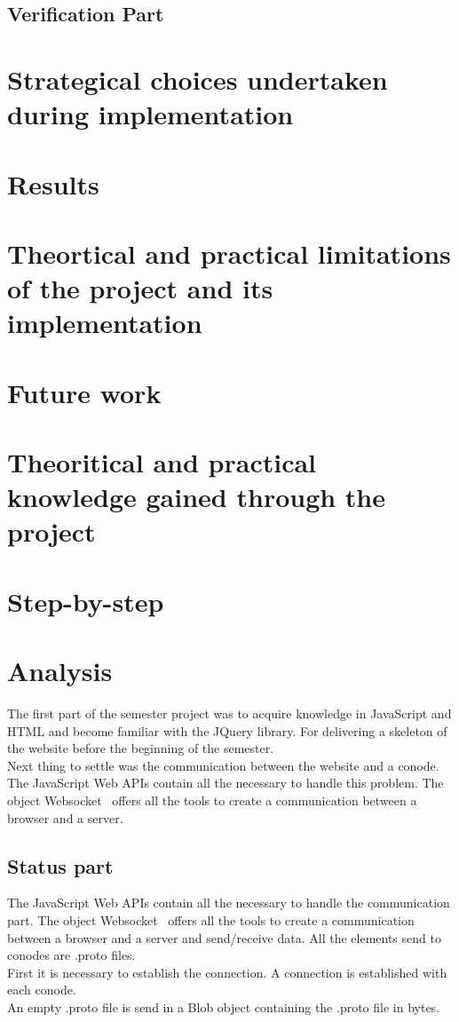 \documentclass[11pt, a4paper, twoside, openright, openany]{book} %
\begin{document}

\section{Verification Part}


\chapter{Strategical choices undertaken during implementation}
\chapter{Results}
\chapter{Theortical and practical limitations of the project and its implementation}
\chapter{Future work}
\chapter{Theoritical and practical knowledge gained through the project}
\chapter{Step-by-step}

\iffalse
\chapter{Analysis}
The first part of the semester project was to acquire knowledge in JavaScript and
HTML and become familiar with the JQuery library. For delivering a skeleton of
the website before the beginning of the semester.\\
Next thing to settle was the communication between the website and a conode.
The JavaScript Web APIs contain all the necessary to handle this problem.
The object Websocket~\cite{websocketPage} offers all the tools to create a
communication between a browser and a server.\\

\section{Status part}
The JavaScript Web APIs contain all the necessary to handle the communication
part. The object Websocket~\cite{websocketPage} offers all the tools to create a
communication between a browser and a server and send/receive data. All the elements send to conodes are .proto files.\\
First it is necessary to establish the connection. A connection is established
with each conode.\\
An empty .proto file is send in a Blob object containing the .proto file in bytes.\\
\end{document}
